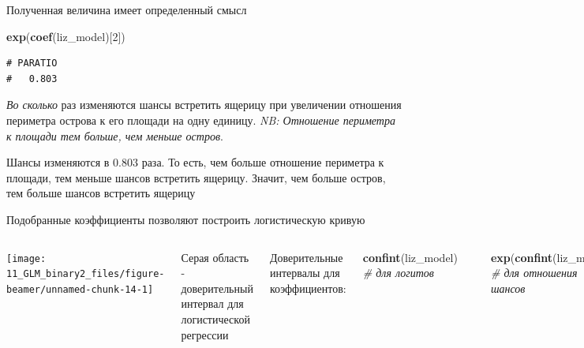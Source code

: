 \documentclass[ignorenonframetext,]{beamer}
\newenvironment{Shaded}{\begin{snugshade}}{\end{snugshade}}
\newcommand{\KeywordTok}[1]{\textcolor[rgb]{0.13,0.29,0.53}{\textbf{{#1}}}}
\newcommand{\DecValTok}[1]{\textcolor[rgb]{0.00,0.00,0.81}{{#1}}}
\newcommand{\CommentTok}[1]{\textcolor[rgb]{0.56,0.35,0.01}{\textit{{#1}}}}
\newcommand{\NormalTok}[1]{{#1}}
\newcommand{\columnsbegin}{\begin{columns}}
\newcommand{\columnsend}{\end{columns}}
\begin{document}
\begin{frame}[fragile]{Полученная величина имеет определенный смысл}

\begin{Shaded}
\begin{Highlighting}[]
\KeywordTok{exp}\NormalTok{(}\KeywordTok{coef}\NormalTok{(liz_model)[}\DecValTok{2}\NormalTok{])}
\end{Highlighting}
\end{Shaded}

\begin{verbatim}
# PARATIO 
#   0.803
\end{verbatim}

\emph{Во сколько} раз изменяются шансы встретить ящерицу при увеличении
отношения периметра острова к его площади на одну единицу. \emph{NB:
Отношение периметра к площади тем больше, чем меньше остров}.

Шансы изменяются в 0.803 раза. То есть, чем больше отношение периметра к
площади, тем меньше шансов встретить ящерицу. Значит, чем больше остров,
тем больше шансов встретить ящерицу

\end{frame}

\begin{frame}[fragile]{Подобранные коэффициенты позволяют построить
логистическую кривую}

\columnsbegin
{}

\begin{flushleft}\texttt{[image: 11\_GLM\_binary2\_files/figure-beamer/unnamed-chunk-14-1]} \end{flushleft}

 Серая область - доверительный интервал для
логистической регрессии

Доверительные интервалы для коэффициентов:

\begin{Shaded}
\begin{Highlighting}[]
\KeywordTok{confint}\NormalTok{(liz_model) }\CommentTok{# для логитов}
\end{Highlighting}
\end{Shaded}

\begin{verbatim}
#              2.5 %  97.5 %
# (Intercept)  1.006  8.0421
# PARATIO     -0.485 -0.0665
\end{verbatim}

\begin{Shaded}
\begin{Highlighting}[]
\KeywordTok{exp}\NormalTok{(}\KeywordTok{confint}\NormalTok{(liz_model)) }\CommentTok{# для отношения шансов}
\end{Highlighting}
\end{Shaded}

\begin{verbatim}
#             2.5 %   97.5 %
# (Intercept) 2.734 3109.275
# PARATIO     0.616    0.936
\end{verbatim}

\columnsend

\end{frame}
\end{document}

